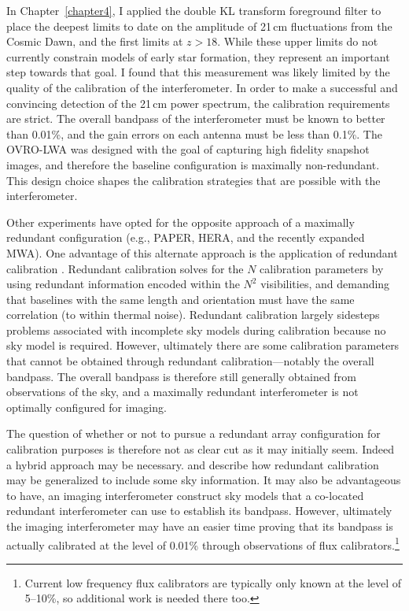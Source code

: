\begin{bibunit}
In Chapter~\ref{chapter4}, I applied the double KL transform foreground filter to place the deepest
limits to date on the amplitude of 21\,cm fluctuations from the Cosmic Dawn, and the first limits at
$z > 18$. While these upper limits do not currently constrain models of early star formation, they
represent an important step towards that goal. I found that this measurement was likely limited by
the quality of the calibration of the interferometer.  In order to make a successful and convincing
detection of the 21\,cm power spectrum, the calibration requirements are strict. The overall
bandpass of the interferometer must be known to better than 0.01\%, and the gain errors on each
antenna must be less than 0.1\%. The OVRO-LWA was designed with the goal of capturing high fidelity
snapshot images, and therefore the baseline configuration is maximally non-redundant. This design
choice shapes the calibration strategies that are possible with the interferometer.

Other experiments have opted for the opposite approach of a maximally redundant configuration (e.g.,
PAPER, HERA, and the recently expanded MWA). One advantage of this alternate approach is the
application of redundant calibration \citep{2010MNRAS.408.1029L}. Redundant calibration solves for
the $N$ calibration parameters by using redundant information encoded within the $N^2$ visibilities,
and demanding that baselines with the same length and orientation must have the same correlation (to
within thermal noise). Redundant calibration largely sidesteps problems associated with incomplete
sky models during calibration because no sky model is required. However, ultimately there are some
calibration parameters that cannot be obtained through redundant calibration---notably the overall
bandpass. The overall bandpass is therefore still generally obtained from observations of the sky,
and a maximally redundant interferometer is not optimally configured for imaging.

The question of whether or not to pursue a redundant array configuration for calibration purposes is
therefore not as clear cut as it may initially seem.  Indeed a hybrid approach may be necessary.
\citet{2010MNRAS.408.1029L} and \citet{2017arXiv170101860S} describe how redundant calibration may
be generalized to include some sky information.  It may also be advantageous to have, an imaging
interferometer construct sky models that a co-located redundant interferometer can use to establish
its bandpass. However, ultimately the imaging interferometer may have an easier time proving that
its bandpass is actually calibrated at the level of 0.01\% through observations of flux
calibrators.\footnote{
    Current low frequency flux calibrators are typically only known at the level of 5--10\%, so
    additional work is needed there too.
}


\end{bibunit}
